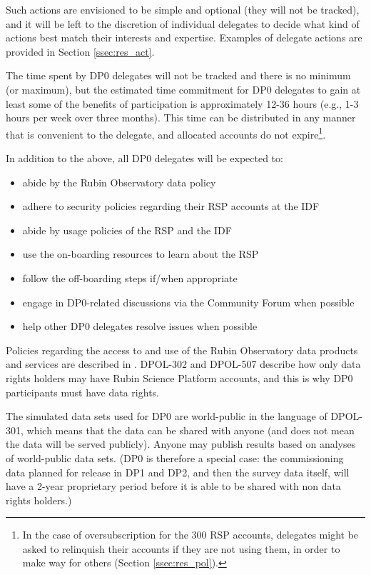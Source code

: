 \documentclass[DM,lsstdraft,authoryear,toc]{lsstdoc}
\begin{document}
Such actions are envisioned to be simple and optional (they will not be tracked), and it will be left to the discretion of individual delegates to decide what kind of actions best match their interests and expertise.
Examples of delegate actions are provided in Section \ref{ssec:res_act}.

The time spent by DP0 delegates will not be tracked and there is no minimum (or maximum), but the estimated time commitment for DP0 delegates to gain at least some of the benefits of participation is approximately 12-36 hours (e.g., 1-3 hours per week over three months).
This time can be distributed in any manner that is convenient to the delegate, and allocated accounts do not expire\footnote{In the case of oversubscription for the 300 RSP accounts, delegates might be asked to relinquish their accounts if they are not using them, in order to make way for others (Section \ref{ssec:res_pol}).}.

In addition to the above, all DP0 delegates will be expected to:
\begin{itemize}
\item abide by the Rubin Observatory data policy 
\item adhere to security policies regarding their RSP accounts at the IDF
\item abide by usage policies of the RSP and the IDF
\item use the on-boarding resources to learn about the RSP
\item follow the off-boarding steps if/when appropriate
\item engage in DP0-related discussions via the Community Forum when possible
\item help other DP0 delegates resolve issues when possible
\end{itemize}

Policies regarding the access to and use of the Rubin Observatory data products and services are described in .
DPOL-302 and DPOL-507 describe how only data rights holders may have Rubin Science Platform accounts, and this is why DP0 participants must have data rights.

The simulated data sets used for DP0 are world-public in the language of DPOL-301, which means that the data can be shared with anyone (and does not mean the data will be served publicly).
Anyone may publish results based on analyses of world-public data sets.
(DP0 is therefore a special case: the commissioning data planned for release in DP1 and DP2, and then the survey data itself, will have a 2-year proprietary period before it is able to be shared with non data rights holders.)
\end{document}
